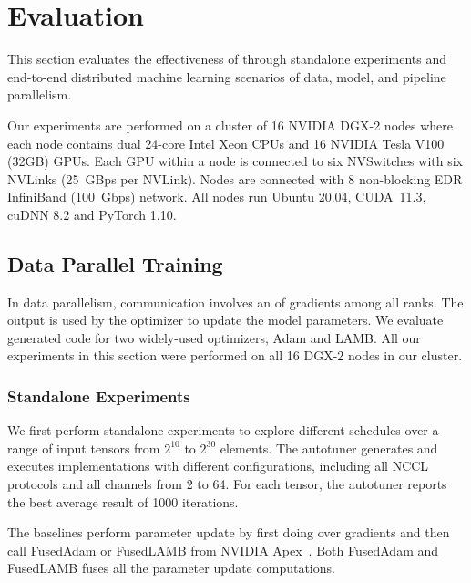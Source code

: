 \section{Evaluation}
\label{sec:experiments}

This section evaluates the effectiveness of \tool through standalone experiments and end-to-end distributed machine learning scenarios of data, model, and pipeline parallelism.

Our experiments are performed on a cluster of 16 NVIDIA DGX-2 nodes where each node contains dual 24-core Intel Xeon CPUs and 16 NVIDIA Tesla V100 (32GB) GPUs.
Each GPU within a node is connected to six NVSwitches with six NVLinks (25~GBps per NVLink).
Nodes are connected with 8 non-blocking EDR InfiniBand (100~Gbps) network.
All nodes run Ubuntu 20.04, CUDA~11.3, cuDNN 8.2 and PyTorch 1.10.

\subsection{Data Parallel Training}
In data parallelism, communication involves an \allreduce of gradients among all ranks. The output is used by the optimizer to update the model parameters.  We evaluate \tool generated code for two widely-used optimizers, Adam and LAMB.
All our experiments in this section were performed on all 16 DGX-2 nodes in our cluster.

\subsubsection{Standalone Experiments}
We first perform standalone experiments to explore different \tool schedules over a range of input tensors from $2^{10}$ to $2^{30}$ elements.
The autotuner generates and executes implementations with different configurations, including all NCCL protocols and all channels from 2 to 64.
For each tensor, the autotuner reports the best average result of 1000 iterations.

 The baselines perform parameter update by first doing \allreduce over gradients and then call FusedAdam or FusedLAMB from NVIDIA Apex~\cite{apex}. 
Both FusedAdam and FusedLAMB fuses all the parameter update computations.

